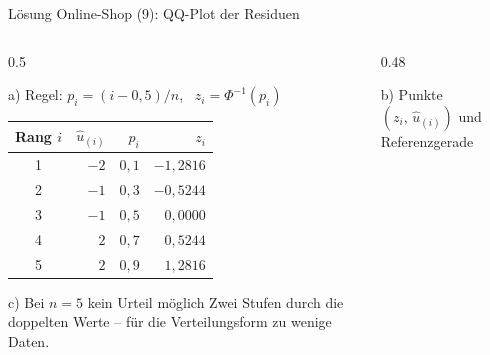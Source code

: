 \documentclass[aspectratio=169,11pt]{beamer}
\begin{document}
\begin{frame}{Lösung Online-Shop (9): QQ-Plot der Residuen}
  \begin{columns}[T]
    \begin{column}{0.5\textwidth}
      \begin{block}{a) Regel: $p_i = (i - 0{,}5)/n$, \ $z_i = \Phi^{-1}(p_i)$}
        \begin{center}
          \renewcommand{\arraystretch}{1.02}
          \begin{tabular}{crrr}
            \toprule
            Rang $i$ & $\hat{u}_{(i)}$ & $p_i$ & $z_i$ \\
            \midrule
            1 & $-2$ & $0{,}1$ & $-1{,}2816$ \\
            2 & $-1$ & $0{,}3$ & $-0{,}5244$ \\
            3 & $-1$ & $0{,}5$ & $0{,}0000$ \\
            4 & $2$  & $0{,}7$ & $0{,}5244$ \\
            5 & $2$  & $0{,}9$ & $1{,}2816$ \\
            \bottomrule
          \end{tabular}
        \end{center}
      \end{block}
      \begin{alertblock}{c) Bei $n = 5$ kein Urteil möglich}
        Zwei Stufen durch die doppelten Werte -- für die Verteilungsform zu wenige Daten.
      \end{alertblock}
    \end{column}
    \begin{column}{0.48\textwidth}
      \begin{center}\footnotesize b) Punkte $(z_i,\,\hat{u}_{(i)})$ und Referenzgerade\end{center}
    \end{column}
  \end{columns}
\end{frame}
\end{document}
